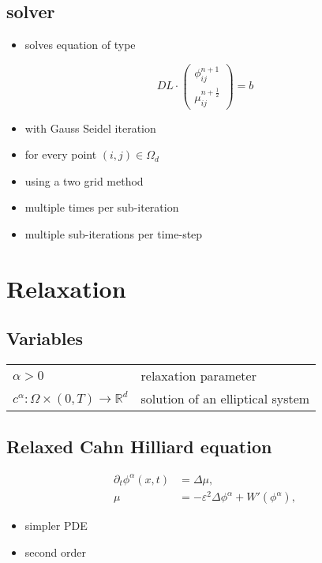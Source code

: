 \documentclass[11pt]{article}
\begin{document}
\subsection*{solver}
\label{sec:orgb4c20cd}
\begin{itemize}
\item solves equation of type
\end{itemize}
\begin{equation}
DL \cdot
\begin{pmatrix}
\phi^{n+1}_{ij} \\
\mu^{n+\frac{1}{2}}_{ij}
\end{pmatrix}
= b
\end{equation}
\begin{itemize}
\item with Gauss Seidel iteration
\item for every point \((i,j) \in \Omega_d\)
\item using a  two grid method
\item multiple times per sub-iteration
\item multiple sub-iterations per time-step
\end{itemize}
\section*{Relaxation}
\label{sec:org1f6ab6d}
\subsection*{Variables}
\label{sec:org20d239b}
\begin{center}
\begin{tabular}{ll}
\(\alpha > 0\) & relaxation parameter\\
\(c^{\alpha}:\Omega \times (0,T) \to \mathbb{R}^d\) & solution of an elliptical system\\
\end{tabular}
\end{center}
\subsection*{Relaxed Cahn Hilliard equation}
\label{sec:orgf65c34e}
\begin{equation}
\label{eq:relaxed-cahn-hilliard}
\begin{aligned}
\partial_{t}\phi^{\alpha}(x,t) &=  \Delta\mu, \\
\mu &= - \varepsilon^2 \Delta\phi^{\alpha}  + W'(\phi^{\alpha}),
\end{aligned}
\end{equation}
\begin{itemize}
\item simpler PDE
\item second order
\end{itemize}
\end{document}
